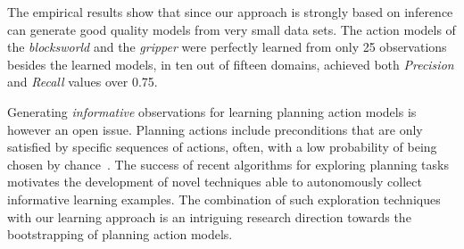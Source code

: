 \documentclass{article}
\begin{document}
The empirical results show that since our approach is strongly based on inference can generate good quality models from very small data sets. The action models of the {\em blocksworld} and the {\em gripper} were perfectly learned from only 25 observations besides the learned models, in ten out of fifteen domains, achieved both {\em Precision} and {\em Recall} values over 0.75.

Generating {\em informative} observations for learning planning action models is however an open issue. Planning actions include preconditions that are only satisfied by specific sequences of actions, often, with a low probability of being chosen by chance~\cite{fern2004learning}. The success of recent algorithms for exploring planning tasks~\cite{geffner:novelty:IJCAI17} motivates the development of novel techniques able to autonomously collect informative learning examples. The combination of such exploration techniques with our learning approach is an intriguing research direction towards the bootstrapping of planning action models.





\newpage


\end{document}
